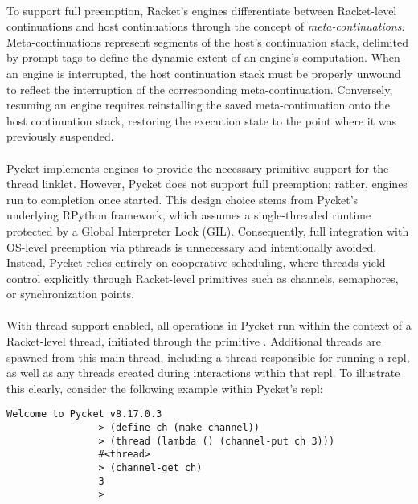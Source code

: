 				\paragraph{}%
					To support full preemption, Racket's engines differentiate between Racket-level continuations and host continuations through the concept of \emph{meta-continuations}. Meta-continuations represent segments of the host's continuation stack, delimited by prompt tags to define the dynamic extent of an engine's computation. When an engine is interrupted, the host continuation stack must be properly unwound to reflect the interruption of the corresponding meta-continuation. Conversely, resuming an engine requires reinstalling the saved meta-continuation onto the host continuation stack, restoring the execution state to the point where it was previously suspended.

				\paragraph{}%
					Pycket implements engines to provide the necessary primitive support for the thread linklet. However, Pycket does not support full preemption; rather, engines run to completion once started. This design choice stems from Pycket's underlying RPython framework, which assumes a single-threaded runtime protected by a Global Interpreter Lock (GIL). Consequently, full integration with OS-level preemption via pthreads is unnecessary and intentionally avoided. Instead, Pycket relies entirely on cooperative scheduling, where threads yield control explicitly through Racket-level primitives such as channels, semaphores, or synchronization points.

				\paragraph{}%
					With thread support enabled, all operations in Pycket run within the context of a Racket-level thread, initiated through the primitive . Additional threads are spawned from this main thread, including a thread responsible for running a \gls{repl}, as well as any threads created during interactions within that \gls{repl}. To illustrate this clearly, consider the following example within Pycket's \gls{repl}:

				\begin{center}
					\begin{minipage}{0.5\textwidth}
						\begin{lstlisting}[style=bashstyle,frame=lines,numbers=none,basicstyle=\scriptsize\ttfamily\linespread{0.85}\selectfont]
				Welcome to Pycket v8.17.0.3
				> (define ch (make-channel))
				> (thread (lambda () (channel-put ch 3)))
				#<thread>
				> (channel-get ch)
				3
				>\end{lstlisting}
					\end{minipage}
				\end{center}

